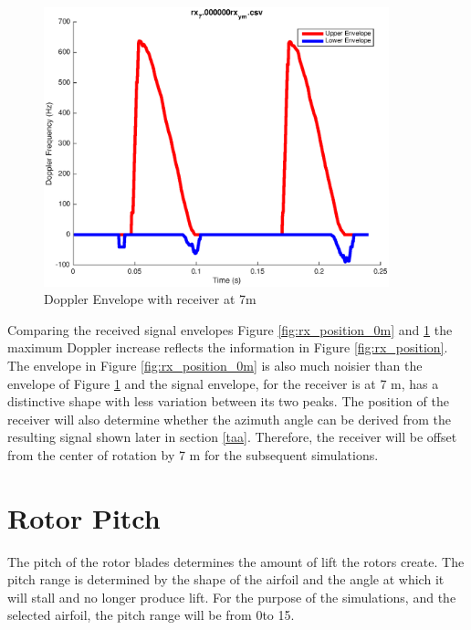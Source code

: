 \begin{figure}
	\begin{center}
		\includegraphics[width=10cm]{images/simulation/Doppler_Receiver_7m.eps}
		\caption{Doppler Envelope with receiver at 7m}
		\label{fig:rx_position_7m}
	\end{center}
\end{figure}

Comparing the received signal envelopes Figure \ref{fig:rx_position_0m} and \ref{fig:rx_position_7m} the maximum Doppler increase reflects the information in Figure \ref{fig:rx_position}. The envelope in Figure \ref{fig:rx_position_0m} is also much noisier than the envelope of Figure \ref{fig:rx_position_7m} and the signal envelope, for the receiver is at 7 m, has a distinctive shape with less variation between its two peaks. The position of the receiver will also determine whether the azimuth angle can be derived from the resulting signal shown later in section \ref{taa}. Therefore, the receiver will be offset from the center of rotation by 7 m for the subsequent simulations.


\section{Rotor Pitch}
The pitch of the rotor blades determines the amount of lift the rotors create. The pitch range is determined by the shape of the airfoil and the angle at which it will stall and no longer produce lift. For the purpose of the simulations, and the selected airfoil, the pitch range will be from 0\textdegree  \space to 15\textdegree.


